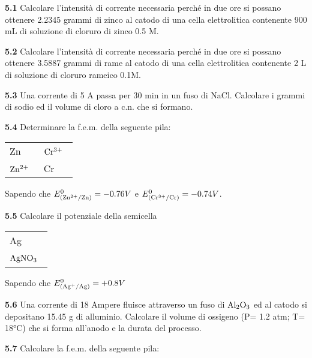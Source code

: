\textbf{5.1} Calcolare l’intensità di corrente necessaria perché in due ore si possano ottenere 2.2345 grammi di zinco al catodo di una cella elettrolitica contenente 900 mL di soluzione di cloruro di zinco 0.5 M.

\vspace{0.2cm}\textbf{5.2} Calcolare l’intensità di corrente necessaria perché in due ore si possano ottenere 3.5887 grammi di rame al catodo di una cella elettrolitica contenente 2 L di soluzione di cloruro rameico 0.1M.

\vspace{0.2cm}\textbf{5.3} Una corrente di 5 A passa per 30 min in un fuso di NaCl. Calcolare i grammi di sodio ed il
volume di cloro a c.n. che si formano.

\vspace{0.2cm}\textbf{5.4} Determinare la f.e.m. della seguente pila:

\begin{center}
    \begin{tabular}{|p{3.7cm}||p{3.7cm}|}
         Zn & $\rm Cr^{3+}$ \, \\[0.5ex]
         $\rm Zn^{2+}$ \,  & Cr\\[0.5ex]
    \end{tabular}
\end{center}

Sapendo che $E^{0}_{(\rm Zn^{2+}/Zn)}=-0.76V$ e $E^{0}_{(\rm Cr^{3+}/Cr)}=-0.74V$.

\vspace{0.2cm}\textbf{5.5} Calcolare il potenziale della semicella 

\begin{center}
    \begin{tabular}{|p{3.7cm}|}
         Ag\\[0.5ex]
         $\rm AgNO_3$ \, \\[0.5ex]
    \end{tabular}
\end{center}

Sapendo che $E^{0}_{(\rm Ag^{+}/Ag)}=+0.8V$

\vspace{0.2cm}\textbf{5.6} Una corrente di 18 Ampere fluisce attraverso un fuso di $\rm Al_2O_3$ ed al catodo si depositano 15.45 g
di alluminio. Calcolare il volume di ossigeno (P= 1.2 atm; T= 18°C) che si forma all’anodo e la
durata del processo.

\vspace{0.2cm}\textbf{5.7} Calcolare la f.e.m. della seguente pila:

